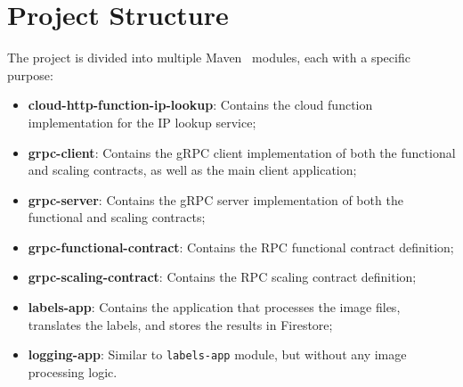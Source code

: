 \chapter{Project Structure}\label{ch:project_structure}

The project is divided into multiple Maven~\cite{maven} modules, each with a specific purpose:

\begin{itemize}
    \item \textbf{cloud-http-function-ip-lookup}: Contains the cloud function implementation for the IP lookup service;
    \item \textbf{grpc-client}:
    Contains the gRPC client implementation of both the functional and scaling contracts, as well as the main client application;
    \item \textbf{grpc-server}: Contains the gRPC server implementation of both the functional and scaling contracts;
    \item \textbf{grpc-functional-contract}: Contains the RPC functional contract definition;
    \item \textbf{grpc-scaling-contract}: Contains the RPC scaling contract definition;
    \item \textbf{labels-app}: Contains the application that processes the image files, translates the labels, and stores the results in Firestore;
    \item \textbf{logging-app}: Similar to \texttt{labels-app} module, but without any image processing logic.
\end{itemize}
